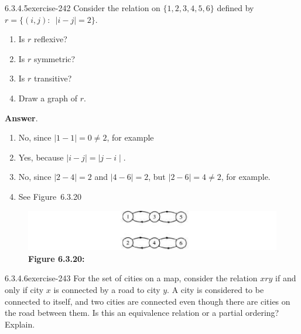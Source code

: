 \documentclass[twoside,10pt,]{book}
\numberwithin{equation}{section}
\begin{document}
\begin{divisionsolution}{6.3.4.5}{}{exercise-242}%
\hypertarget{p-2069}{}%
Consider the  relation on \(\{1, 2, 3, 4, 5, 6\}\) defined by  \(r = \{(i,j):\enspace \lvert i - j\rvert  = 2\}\).%
\par
\hypertarget{p-2070}{}%
\leavevmode%
\begin{enumerate}[label=(\alph*)]
\item\hypertarget{li-1090}{}\hypertarget{p-2071}{}%
Is \(r\) reflexive?%
\item\hypertarget{li-1091}{}\hypertarget{p-2072}{}%
Is \(r\) symmetric?%
\item\hypertarget{li-1092}{}\hypertarget{p-2073}{}%
Is \(r\) transitive?%
\item\hypertarget{li-1093}{}\hypertarget{p-2074}{}%
Draw a graph of \(r\).%
\end{enumerate}
%
\par\smallskip%
\noindent\textbf{Answer}.\quad%
\hypertarget{p-2075}{}%
\leavevmode%
\begin{enumerate}[label=(\alph*)]
\item\hypertarget{li-1094}{}\hypertarget{p-2076}{}%
No, since \(\mid 1-1\mid =0\neq 2\), for example%
\item\hypertarget{li-1095}{}\hypertarget{p-2077}{}%
Yes, because \(\mid i-j\mid =\)\(\mid j-i\mid \).%
\item\hypertarget{li-1096}{}\hypertarget{p-2078}{}%
No, since \(\mid 2-4\mid =2\) and \(\mid 4-6\mid =2\), but \(\mid 2-6\mid =4\neq 2\), for example.%
\item\hypertarget{li-1097}{}\hypertarget{p-2079}{}%
See Figure~6.3.20%
\end{enumerate}
%
\begin{figure}
\centering
\includegraphics[width=1\linewidth]{images/fig-sol-6-3-5.png}
\caption*{\textbf{Figure 6.3.20:} }
\end{figure}
\end{divisionsolution}%
\begin{divisionsolution}{6.3.4.6}{}{exercise-243}%
\hypertarget{p-2080}{}%
For the set of cities on a map, consider the relation \(x r y\) if and only if city \(x\) is connected by a road to city \(y\). A city is considered to be connected to itself, and two cities are connected even though there are cities on the road between them. Is this an equivalence relation or a partial ordering? Explain.%
\end{divisionsolution}%
\end{document}

